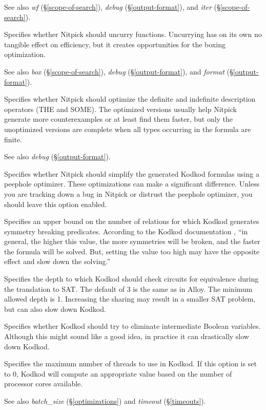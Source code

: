 \documentclass[a4paper,12pt]{article}
\begin{document}
\begin{enum}
{\small See also \textit{wf} (\S\ref{scope-of-search}), \textit{debug}
(\S\ref{output-format}), and \textit{iter} (\S\ref{scope-of-search}).}

Specifies whether Nitpick should uncurry functions. Uncurrying has on its own no
tangible effect on efficiency, but it creates opportunities for the boxing 
optimization.

\nopagebreak
{\small See also \textit{box} (\S\ref{scope-of-search}), \textit{debug}
(\S\ref{output-format}), and \textit{format} (\S\ref{output-format}).}

Specifies whether Nitpick should optimize the definite and indefinite
description operators (THE and SOME). The optimized versions usually help
Nitpick generate more counterexamples or at least find them faster, but only the
unoptimized versions are complete when all types occurring in the formula are
finite.

{\small See also \textit{debug} (\S\ref{output-format}).}

Specifies whether Nitpick should simplify the generated Kodkod formulas using a
peephole optimizer. These optimizations can make a significant difference.
Unless you are tracking down a bug in Nitpick or distrust the peephole
optimizer, you should leave this option enabled.

Specifies an upper bound on the number of relations for which Kodkod generates
symmetry breaking predicates. According to the Kodkod documentation
\cite{kodkod-2009-options}, ``in general, the higher this value, the more
symmetries will be broken, and the faster the formula will be solved. But,
setting the value too high may have the opposite effect and slow down the
solving.''

Specifies the depth to which Kodkod should check circuits for equivalence during
the translation to SAT. The default of 3 is the same as in Alloy. The minimum
allowed depth is 1. Increasing the sharing may result in a smaller SAT problem,
but can also slow down Kodkod.

Specifies whether Kodkod should try to eliminate intermediate Boolean variables.
Although this might sound like a good idea, in practice it can drastically slow
down Kodkod.

Specifies the maximum number of threads to use in Kodkod. If this option is set
to 0, Kodkod will compute an appropriate value based on the number of processor
cores available.

\nopagebreak
{\small See also \textit{batch\_size} (\S\ref{optimizations}) and
\textit{timeout} (\S\ref{timeouts}).}
\end{enum}
\end{document}
